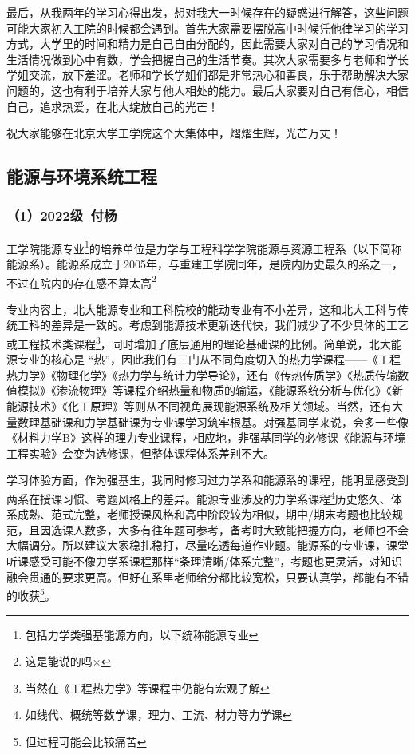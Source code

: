 \documentclass[11pt,oneside]{book}
\begin{document}
\vspace{10pt}

最后，从我两年的学习心得出发，想对我大一时候存在的疑惑进行解答，这些问题可能大家初入工院的时候都会遇到。首先大家需要摆脱高中时候凭他律学习的学习方式，大学里的时间和精力是自己自由分配的，因此需要大家对自己的学习情况和生活情况做到心中有数，学会把握自己的生活节奏。其次大家需要多与老师和学长学姐交流，放下羞涩。老师和学长学姐们都是非常热心和善良，乐于帮助解决大家问题的，这也有利于培养大家与他人相处的能力。最后大家要对自己有信心，相信自己，追求热爱，在北大绽放自己的光芒！

\vspace{10pt}

祝大家能够在北京大学工学院这个大集体中，熠熠生辉，光芒万丈！

\subsection{能源与环境系统工程}
\subsubsection{（1）2022级\ 付杨}
工学院能源专业\footnote{包括力学类强基能源方向，以下统称能源专业}的培养单位是力学与工程科学学院能源与资源工程系（以下简称能源系）。能源系成立于2005年，与重建工学院同年，是院内历史最久的系之一，不过在院内的存在感不算太高\footnote{这是能说的吗×}

专业内容上，北大能源专业和工科院校的能动专业有不小差异，这和北大工科与传统工科的差异是一致的。考虑到能源技术更新迭代快，我们减少了不少具体的工艺或工程技术类课程\footnote{当然在《工程热力学》等课程中仍能有宏观了解}，同时增加了底层通用的理论基础课的比例。简单说，北大能源专业的核心是 “热”，因此我们有三门从不同角度切入的热力学课程——《工程热力学》《物理化学》《热力学与统计力学导论》，还有《传热传质学》《热质传输数值模拟》《渗流物理》等课程介绍热量和物质的输运，《能源系统分析与优化》《新能源技术》《化工原理》等则从不同视角展现能源系统及相关领域。当然，还有大量数理基础课和力学基础课为专业课学习筑牢根基。对强基同学来说，会多一些像《材料力学B》这样的理力专业课程，相应地，非强基同学的必修课《能源与环境工程实验》会变为选修课，但整体课程体系差别不大。

\vspace{10pt}

学习体验方面，作为强基生，我同时修习过力学系和能源系的课程，能明显感受到两系在授课习惯、考题风格上的差异。能源专业涉及的力学系课程\footnote{如线代、概统等数学课，理力、工流、材力等力学课}历史悠久、体系成熟、范式完整，老师授课风格和高中阶段较为相似，期中/期末考题也比较规范，且因选课人数多，大多有往年题可参考，备考时大致能把握方向，老师也不会大幅调分。所以建议大家稳扎稳打，尽量吃透每道作业题。能源系的专业课，课堂听课感受可能不像力学系课程那样“条理清晰/体系完整”，考题也更灵活，对知识融会贯通的要求更高。但好在系里老师给分都比较宽松，只要认真学，都能有不错的收获\footnote{但过程可能会比较痛苦}。
\end{document}
